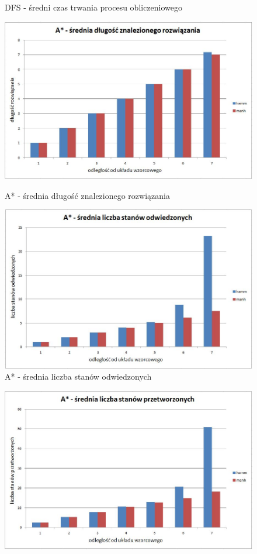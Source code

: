 \documentclass{classrep}
\begin{document}
{\begin{figure}[ht!]
\begin{center}
		\caption{DFS - średni czas trwania procesu obliczeniowego}
	\end{center}
\end{figure}
\newpage
\begin{figure}[ht!]
	\begin{center}
		\vspace{0.3in}
		\includegraphics[scale=0.6]{astr1}
		\caption{A* - średnia długość znalezionego rozwiązania}
		\vspace{0.5in}
		\includegraphics[scale=0.6]{astr2}
		\caption{A* - średnia liczba stanów odwiedzonych}
	\end{center}
\end{figure}
\newpage
\begin{figure}[ht!]
	\begin{center}
		\vspace{0.3in}
		\includegraphics[scale=0.6]{astr3}

\end{center}
\end{figure}}
\end{document}
